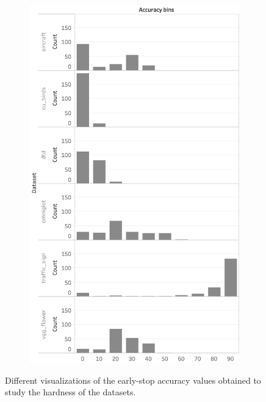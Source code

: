 \begin{figure}[ht]
\begin{subfigure}{.5\textwidth}
      \includegraphics[width=0.9\linewidth]{imgs/histogram-accuracies.png}
  \caption{}
  \label{fig:appA:histogram}
\end{subfigure}
\caption{Different visualizations of the early-stop accuracy values obtained to study the hardness of the datasets.}
\label{fig:appA:trialstats}
\end{figure}


